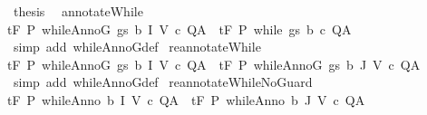 \begin{isabellebody}
\ {\isacharquery}thesis\ \isacommand{{\isachardot}}\isamarkupfalse%
\isanewline
{}\isamarkupfalse%
%
\endisatagproof
{\isafoldproof}%
%
\isadelimproof
\isanewline
%
\endisadelimproof
\isanewline
\isanewline
{}\isamarkupfalse%
\ annotateWhile{\isacharcolon}\isanewline
{\isachardoublequoteopen}{\isasymlbrakk}{\isasymGamma}{\isacharcomma}{\isasymTheta}{\isasymturnstile}\isactrlsub t\isactrlbsub {\isacharslash}F\isactrlesub \ P\ {\isacharparenleft}whileAnnoG\ gs\ b\ I\ V\ c{\isacharparenright}\ Q{\isacharcomma}A{\isasymrbrakk}\ {\isasymLongrightarrow}\ {\isasymGamma}{\isacharcomma}{\isasymTheta}{\isasymturnstile}\isactrlsub t\isactrlbsub {\isacharslash}F\isactrlesub \ P\ {\isacharparenleft}while\ gs\ b\ c{\isacharparenright}\ Q{\isacharcomma}A{\isachardoublequoteclose}\isanewline
%
\isadelimproof
\ \ %
\endisadelimproof
%
\isatagproof
{}\isamarkupfalse%
\ {\isacharparenleft}simp\ add{\isacharcolon}\ whileAnnoG{\isacharunderscore}def{\isacharparenright}%
\endisatagproof
{\isafoldproof}%
%
\isadelimproof
\isanewline
%
\endisadelimproof
\isanewline
\isanewline
{}\isamarkupfalse%
\ reannotateWhile{\isacharcolon}\isanewline
{\isachardoublequoteopen}{\isasymlbrakk}{\isasymGamma}{\isacharcomma}{\isasymTheta}{\isasymturnstile}\isactrlsub t\isactrlbsub {\isacharslash}F\isactrlesub \ P\ {\isacharparenleft}whileAnnoG\ gs\ b\ I\ V\ c{\isacharparenright}\ Q{\isacharcomma}A{\isasymrbrakk}\ {\isasymLongrightarrow}\ {\isasymGamma}{\isacharcomma}{\isasymTheta}{\isasymturnstile}\isactrlsub t\isactrlbsub {\isacharslash}F\isactrlesub \ P\ {\isacharparenleft}whileAnnoG\ gs\ b\ J\ V\ c{\isacharparenright}\ Q{\isacharcomma}A{\isachardoublequoteclose}\isanewline
%
\isadelimproof
\ \ %
\endisadelimproof
%
\isatagproof
{}\isamarkupfalse%
\ {\isacharparenleft}simp\ add{\isacharcolon}\ whileAnnoG{\isacharunderscore}def{\isacharparenright}%
\endisatagproof
{\isafoldproof}%
%
\isadelimproof
\isanewline
%
\endisadelimproof
\isanewline
{}\isamarkupfalse%
\ reannotateWhileNoGuard{\isacharcolon}\isanewline
{\isachardoublequoteopen}{\isasymlbrakk}{\isasymGamma}{\isacharcomma}{\isasymTheta}{\isasymturnstile}\isactrlsub t\isactrlbsub {\isacharslash}F\isactrlesub \ P\ {\isacharparenleft}whileAnno\ b\ I\ V\ c{\isacharparenright}\ Q{\isacharcomma}A{\isasymrbrakk}\ {\isasymLongrightarrow}\ {\isasymGamma}{\isacharcomma}{\isasymTheta}{\isasymturnstile}\isactrlsub t\isactrlbsub {\isacharslash}F\isactrlesub \ P\ {\isacharparenleft}whileAnno\ b\ J\ V\ c{\isacharparenright}\ Q{\isacharcomma}A{\isachardoublequoteclose}\isanewline

\end{isabellebody}
